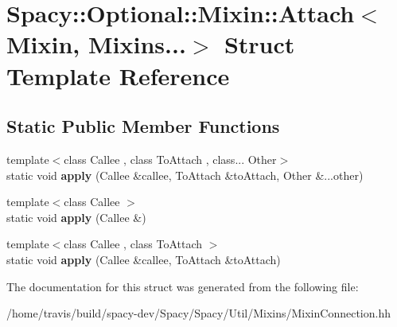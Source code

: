 \hypertarget{structSpacy_1_1Optional_1_1Mixin_1_1Attach_3_01Mixin_00_01Mixins_8_8_8_4}{\section{Spacy\-:\-:Optional\-:\-:Mixin\-:\-:Attach$<$ Mixin, Mixins...$>$ Struct Template Reference}
\label{structSpacy_1_1Optional_1_1Mixin_1_1Attach_3_01Mixin_00_01Mixins_8_8_8_4}
}
\subsection*{Static Public Member Functions}
\begin{DoxyCompactItemize}
\item 
\hypertarget{structSpacy_1_1Optional_1_1Mixin_1_1Attach_3_01Mixin_00_01Mixins_8_8_8_4_ad894bb9d5fba81bdc5ee4b92b2bd3ea2}{{\footnotesize template$<$class Callee , class To\-Attach , class... Other$>$ }\\static void {\bfseries apply} (Callee \&callee, To\-Attach \&to\-Attach, Other \&...other)}\label{structSpacy_1_1Optional_1_1Mixin_1_1Attach_3_01Mixin_00_01Mixins_8_8_8_4_ad894bb9d5fba81bdc5ee4b92b2bd3ea2}

\item 
\hypertarget{structSpacy_1_1Optional_1_1Mixin_1_1Attach_3_01Mixin_00_01Mixins_8_8_8_4_aeea135fae70063c50a7be0d29bbc46d5}{{\footnotesize template$<$class Callee $>$ }\\static void {\bfseries apply} (Callee \&)}\label{structSpacy_1_1Optional_1_1Mixin_1_1Attach_3_01Mixin_00_01Mixins_8_8_8_4_aeea135fae70063c50a7be0d29bbc46d5}

\item 
\hypertarget{structSpacy_1_1Optional_1_1Mixin_1_1Attach_3_01Mixin_00_01Mixins_8_8_8_4_a9986fd89deea15e2e3d55272bd4ff1f7}{{\footnotesize template$<$class Callee , class To\-Attach $>$ }\\static void {\bfseries apply} (Callee \&callee, To\-Attach \&to\-Attach)}\label{structSpacy_1_1Optional_1_1Mixin_1_1Attach_3_01Mixin_00_01Mixins_8_8_8_4_a9986fd89deea15e2e3d55272bd4ff1f7}

\end{DoxyCompactItemize}


The documentation for this struct was generated from the following file\-:\begin{DoxyCompactItemize}
\item 
/home/travis/build/spacy-\/dev/\-Spacy/\-Spacy/\-Util/\-Mixins/Mixin\-Connection.\-hh\end{DoxyCompactItemize}
